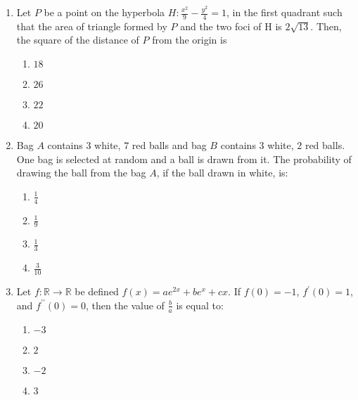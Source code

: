 \documentclass[journal]{IEEEtran}
\newcommand{\brak}[1]{\left( #1 \right)}
\begin{document}
\begin{enumerate}
        \begin{multicols}{4}
        \begin{enumerate}
        \item $-14$
        \item $26$
        \item $-16$
        \item $36$
        \end{enumerate}
        \end{multicols}


    \item Let $P$ be a point on the hyperbola $H:\frac{x^{2}}{9}-\frac{y^{2}}{4}=1$, in the first quadrant such that the area of triangle formed by $P$ and the two foci of H is $2\sqrt{13}$. Then, the square of the distance of $P$ from the origin is

        \begin{multicols}{4}
        \begin{enumerate}
        \item $18$
        \item $26$
        \item $22$
        \item $20$
        \end{enumerate}
        \end{multicols}

    \item Bag $A$ contains $3$ white, $7$ red balls and bag $B$ contains $3$ white, $2$ red balls. One bag is selected at random and a ball is drawn from it. The probability of drawing the ball from the bag $A$, if the ball drawn in white, is:

        \begin{multicols}{4}
        \begin{enumerate}
        \item $\frac{1}{4}$
        \item $\frac{1}{9}$
        \item $\frac{1}{3}$
        \item $\frac{3}{10}$
        \end{enumerate}
        \end{multicols}

    \item Let $f:\mathbb{R}\rightarrow\mathbb{R}$ be defined $f\brak{x}=ae^{2x}+be^{x}+cx$. If $f\brak{0}=-1$, $f^{\prime}\brak{0}=1$, and $f^{\prime\prime}\brak{0}=0$, then the value of $\frac{b}{a}$ is equal to:

        \begin{multicols}{4}
        \begin{enumerate}
        \item $-3$
        \item $2$
        \item $-2$
        \item $3$
        \end{enumerate}
        \end{multicols}

\end{enumerate}
\end{document}
